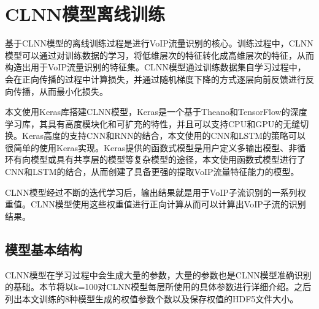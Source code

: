 \section{CLNN模型离线训练}
基于CLNN模型的离线训练过程是进行VoIP流量识别的核心。训练过程中，CLNN模型可以通过对训练数据的学习，将低维层次的特征转化成高维层次的特征，从而构造出用于VoIP流量识别的特征集。CLNN模型通过训练数据集自学习过程中，会在正向传播的过程中计算损失，并通过随机梯度下降的方式逐层向前反馈进行反向传播，从而最小化损失。

本文使用Keras库搭建CLNN模型，Keras是一个基于Theano和TensorFlow的深度学习库，其具有高度模块化和可扩充的特性，并且可以支持CPU和GPU的无缝切换。Keras高度的支持CNN和RNN的结合，本文使用的CNN和LSTM的策略可以很简单的使用Keras实现。Keras提供的函数式模型是用户定义多输出模型、非循环有向模型或具有共享层的模型等复杂模型的途径，本文使用函数式模型进行了CNN和LSTM的结合，从而创建了具备更强的提取VoIP流量特征能力的模型。

CLNN模型经过不断的迭代学习后，输出结果就是用于VoIP子流识别的一系列权重值。CLNN模型使用这些权重值进行正向计算从而可以计算出VoIP子流的识别结果。

\subsection{模型基本结构}
CLNN模型在学习过程中会生成大量的参数，大量的参数也是CLNN模型准确识别的基础。本节将以k=100对CLNN模型每层所使用的具体参数进行详细介绍。之后列出本文训练的8种模型生成的权值参数个数以及保存权值的HDF5文件大小。

